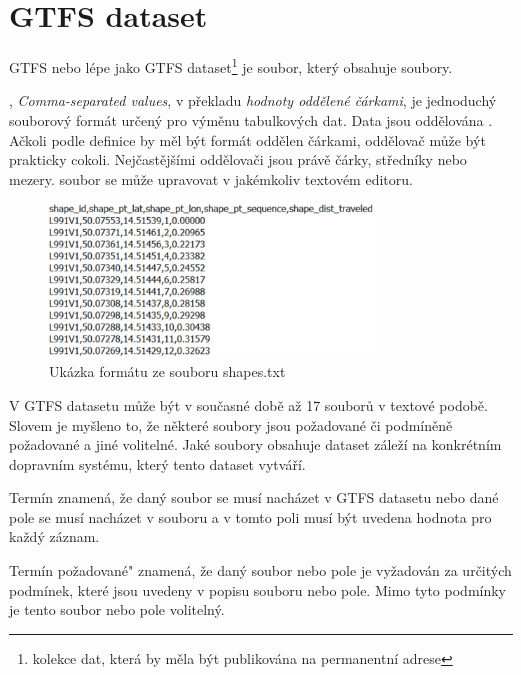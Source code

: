
\section{GTFS dataset}
GTFS  nebo lépe jako GTFS dataset\footnote{kolekce dat, která by měla být publikována na permanentní  adrese}
je  soubor, který obsahuje  soubory.

, \textit{Comma-separated values}, v překladu \textit{hodnoty oddělené čárkami}, je jednoduchý 
souborový formát určený pro výměnu tabulkových dat. Data jsou oddělována .
Ačkoli podle definice by měl být formát oddělen čárkami, oddělovač může být prakticky cokoli. 
Nejčastějšími oddělovači jsou právě čárky, středníky nebo mezery.  soubor se 
může upravovat v jakémkoliv textovém editoru.

\begin{figure}[H] \centering
    \includegraphics[width=250pt]{./pictures/ukazka-csv.PNG}
    \caption[Ukázka  formátu ze souboru shapes.txt]{Ukázka  formátu ze souboru shapes.txt}
	\label{fig:ukazka-csv}              
\end{figure}

V GTFS datasetu může být v současné době až 17  souborů v textové podobě. Slovem  je myšleno to,
že některé  soubory jsou požadované či podmíněně požadované a jiné volitelné.
Jaké  soubory obsahuje dataset záleží na konkrétním dopravním systému, který
tento dataset vytváří.

Termín  znamená, že daný  soubor se musí nacházet v GTFS datasetu nebo dané pole
se musí nacházet v  souboru a v tomto poli musí být uvedena hodnota pro každý záznam. 

Termín  požadované" znamená, že daný  soubor nebo pole je vyžadován za určitých podmínek, 
které jsou uvedeny v popisu souboru nebo pole. Mimo tyto podmínky je tento soubor nebo pole volitelný.

